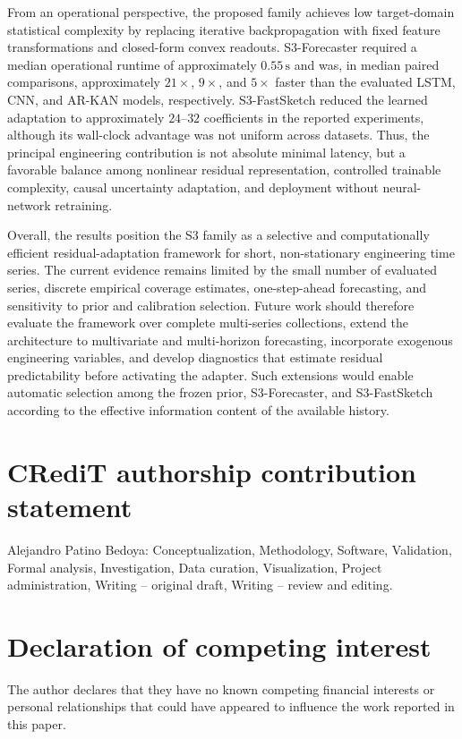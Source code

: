 \documentclass[review,number,sort&compress]{elsarticle}
\begin{document}
From an operational perspective, the proposed family achieves low target-domain statistical complexity by replacing iterative backpropagation with fixed feature transformations and closed-form convex readouts. S3-Forecaster required a median operational runtime of approximately $0.55\,\mathrm{s}$ and was, in median paired comparisons, approximately $21\times$, $9\times$, and $5\times$ faster than the evaluated LSTM, CNN, and AR-KAN models, respectively. S3-FastSketch reduced the learned adaptation to approximately $24$--$32$ coefficients in the reported experiments, although its wall-clock advantage was not uniform across datasets. Thus, the principal engineering contribution is not absolute minimal latency, but a favorable balance among nonlinear residual representation, controlled trainable complexity, causal uncertainty adaptation, and deployment without neural-network retraining.

Overall, the results position the S3 family as a selective and computationally efficient residual-adaptation framework for short, non-stationary engineering time series. The current evidence remains limited by the small number of evaluated series, discrete empirical coverage estimates, one-step-ahead forecasting, and sensitivity to prior and calibration selection. Future work should therefore evaluate the framework over complete multi-series collections, extend the architecture to multivariate and multi-horizon forecasting, incorporate exogenous engineering variables, and develop diagnostics that estimate residual predictability before activating the adapter. Such extensions would enable automatic selection among the frozen prior, S3-Forecaster, and S3-FastSketch according to the effective information content of the available history.


\section*{CRediT authorship contribution statement}

Alejandro Patino Bedoya:
Conceptualization,
Methodology,
Software,
Validation,
Formal analysis,
Investigation,
Data curation,
Visualization,
Project administration,
Writing -- original draft,
Writing -- review and editing.

\section*{Declaration of competing interest}

The author declares that they have no known competing financial
interests or personal relationships that could have appeared to
influence the work reported in this paper.
\end{document}
